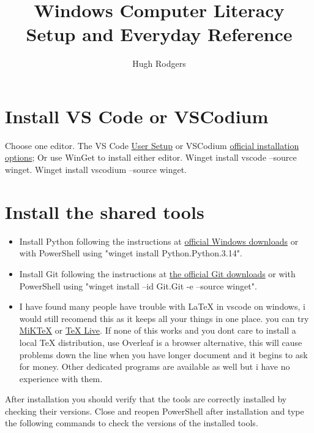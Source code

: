 \documentclass[11pt]{article}
\title{Windows Computer Literacy\\Setup and Everyday Reference}
\author{Hugh Rodgers}
\begin{document}
\maketitle

\tableofcontents

\section{Install VS Code or VSCodium}
  Choose one editor. 
  The VS Code \href{https://code.visualstudio.com/docs/setup/windows}{User Setup} or VSCodium \href{https://vscodium.com/#install}{official installation options}; 
  Or use WinGet to install either editor.
  Winget install vscode --source winget.
  Winget install vscodium --source winget.

\section{Install the shared tools}
  \begin{itemize}

    \item Install Python following the instructions at \href{https://www.python.org/downloads/windows/}{official Windows downloads} 
    or with PowerShell using "winget install Python.Python.3.14".

    \item Install Git following the instructions at \href{https://git-scm.com/download/win}{the official Git downloads} 
    or with PowerShell using "winget install --id Git.Git -e --source winget".

    \item I have found many people have trouble with LaTeX in vscode on windows, i would still recomend this as it keeps all your things in one place.
    you can try \href{https://miktex.org/howto/install-miktex}{MiKTeX} or \href{https://tug.org/texlive/}{TeX Live}. 
    If none of this works and you dont care to install a local TeX distribution, use Overleaf is a browser alternative, this will cause problems down the line when you have longer document and it begins to ask for money.
    Other dedicated programs are available as well but i have no experience with them.
  \end{itemize}

  After installation you should verify that the tools are correctly installed by checking their versions.
  Close and reopen PowerShell after installation and type the following commands to check the versions of the installed tools.
\end{document}

